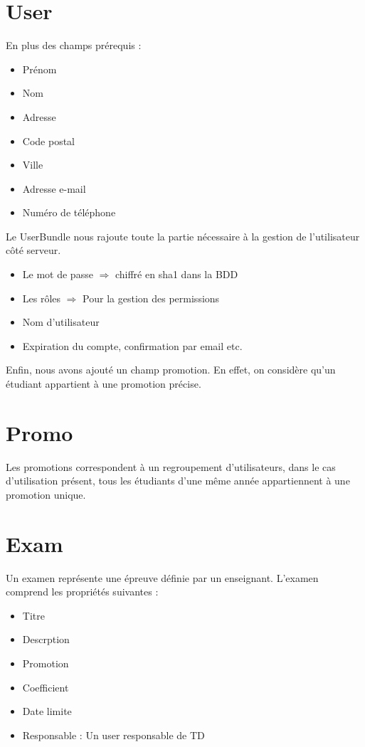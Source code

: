 \documentclass{report}
\begin{document}
    \section{User}
      En plus des champs prérequis :
      \begin{itemize}
        \item{Prénom}
        \item{Nom}
        \item{Adresse}
        \item{Code postal}
        \item{Ville}
        \item{Adresse e-mail}
        \item{Numéro de téléphone}
      \end{itemize}\vspace{1em}

      Le UserBundle nous rajoute toute la partie nécessaire à la gestion de
      l'utilisateur côté serveur.
      \begin{itemize}
        \item{Le mot de passe $\Rightarrow$ chiffré en sha1 dans la BDD}
        \item{Les rôles $\Rightarrow$ Pour la gestion des permissions}
        \item{Nom d'utilisateur}
        \item{Expiration du compte, confirmation par email etc.}
      \end{itemize}\vspace{1em}

      Enfin, nous avons ajouté un champ promotion. En effet, on considère 
      qu'un étudiant appartient à une promotion précise.

    \section{Promo}
      Les promotions correspondent à un regroupement d'utilisateurs, dans le cas
      d'utilisation présent, tous les étudiants d'une même année appartiennent 
      à une promotion unique.


    \section{Exam}
      Un examen représente une épreuve définie par un enseignant. L'examen 
			comprend les propriétés suivantes :
			\begin{itemize}
				\item{Titre}
				\item{Descrption}
				\item{Promotion}
				\item{Coefficient}
				\item{Date limite}
				\item{Responsable : Un user responsable de TD}
      \end{itemize}\vspace{1em}
\end{document}
